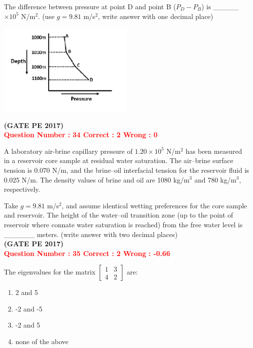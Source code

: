 \documentclass[12pt]{article}
\begin{document}
{The difference between pressure at point D and point B ($P_D - P_B$) is \_\_\_\_\_ $\times 10^5$ N/m$^2$. (use $g = 9.81$ m/s$^2$, write answer with one decimal place)

\begin{center}
    \includegraphics[width=0.5\textwidth]{Figs/GraphQ _33.png} 
\end{center}
\hfill\textbf{(GATE PE 2017)}\\[0.6cm]

\textcolor{red}{\textbf{Question Number : 34 \hfill Correct : 2  Wrong : 0}}

A laboratory air-brine capillary pressure of $1.20 \times 10^5$ N/m$^2$ has been measured in a reservoir core sample at residual water saturation. The air–brine surface tension is 0.070 N/m, and the brine–oil interfacial tension for the reservoir fluid is 0.025 N/m. The density values of brine and oil are 1080 kg/m$^3$ and 780 kg/m$^3$, respectively.

Take $g = 9.81$ m/s$^2$, and assume identical wetting preferences for the core sample and reservoir. The height of the water–oil transition zone (up to the point of reservoir where connate water saturation is reached) from the free water level is \_\_\_\_\_\_ meters. (write answer with two decimal places)\\

\hfill\textbf{(GATE PE 2017)}\\[0.6cm]

\textcolor{red}{\textbf{Question Number : 35 \hfill Correct : 2  Wrong : -0.66}}

The eigenvalues for the matrix 
$ 
\begin{bmatrix}
1 & 3 \\
4 & 2
\end{bmatrix}
$ 
are:

\begin{enumerate}[label=(\Alph*)]
    \item 2 and 5
    \item -2 and -5
    \item -2 and 5
    \item none of the above
\end{enumerate}

}
\end{document}
